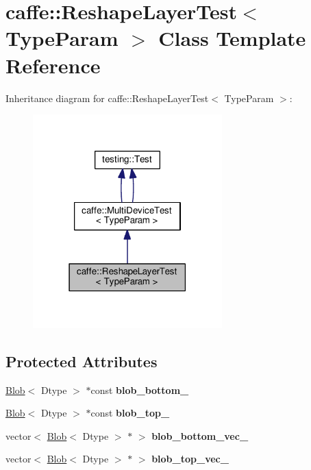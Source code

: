 \hypertarget{classcaffe_1_1_reshape_layer_test}{}\section{caffe\+:\+:Reshape\+Layer\+Test$<$ Type\+Param $>$ Class Template Reference}
\label{classcaffe_1_1_reshape_layer_test}


Inheritance diagram for caffe\+:\+:Reshape\+Layer\+Test$<$ Type\+Param $>$\+:
\nopagebreak
\begin{figure}[H]
\begin{center}
\leavevmode
\includegraphics[width=207pt]{classcaffe_1_1_reshape_layer_test__inherit__graph}
\end{center}
\end{figure}
\subsection*{Protected Attributes}
\begin{DoxyCompactItemize}
\item 
\mbox{\label{classcaffe_1_1_reshape_layer_test_a85267e4981943596791d93cdac557137}} 
\mbox{\hyperlink{classcaffe_1_1_blob}{Blob}}$<$ Dtype $>$ $\ast$const {\bfseries blob\+\_\+bottom\+\_\+}
\item 
\mbox{\label{classcaffe_1_1_reshape_layer_test_a6dd63499e0cfdf74198d4f7d05467593}} 
\mbox{\hyperlink{classcaffe_1_1_blob}{Blob}}$<$ Dtype $>$ $\ast$const {\bfseries blob\+\_\+top\+\_\+}
\item 
\mbox{\label{classcaffe_1_1_reshape_layer_test_a5d70c5140933b9ec47448a0461a37a16}} 
vector$<$ \mbox{\hyperlink{classcaffe_1_1_blob}{Blob}}$<$ Dtype $>$ $\ast$ $>$ {\bfseries blob\+\_\+bottom\+\_\+vec\+\_\+}
\item 
\mbox{\label{classcaffe_1_1_reshape_layer_test_a2927e6aea516472e3f4e54fb99901324}} 
vector$<$ \mbox{\hyperlink{classcaffe_1_1_blob}{Blob}}$<$ Dtype $>$ $\ast$ $>$ {\bfseries blob\+\_\+top\+\_\+vec\+\_\+}
\end{DoxyCompactItemize}
